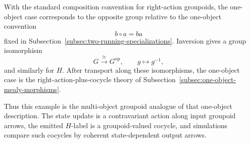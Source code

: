 \begin{example}
    With the standard composition convention for right-action groupoids, the
    one-object case corresponds to the opposite group relative to the
    one-object convention
    \[
        b\circ a=ba
    \]
    fixed in Subsection~\ref{subsec:two-running-specializations}. Inversion
    gives a group isomorphism
    \[
        G\overset{\cong}{\longrightarrow}G^{\mathrm{op}},
        \qquad
        g\longmapsto g^{-1},
    \]
    and similarly for \(H\). After transport along these isomorphisms, the
    one-object case is the right-action-plus-cocycle theory of
    Subsection~\ref{subsec:one-object-mealy-morphisms}.

    Thus this example is the multi-object groupoid analogue of that
    one-object description. The state update is a contravariant action along
    input groupoid arrows, the emitted \(H\)-label is a groupoid-valued
    cocycle, and simulations compare such cocycles by coherent state-dependent
    output arrows.
\end{example}

